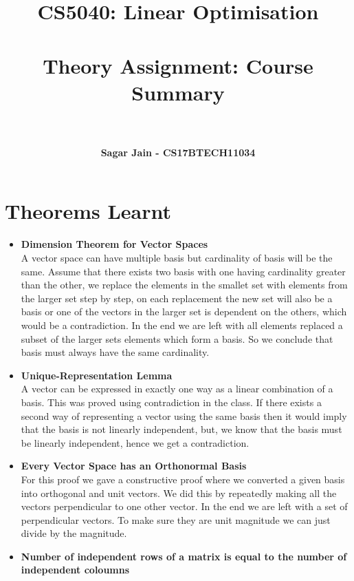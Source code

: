 \documentclass[a4paper,12pt]{report}
\begin{document}
\title{
\textbf{CS5040: Linear Optimisation\\~\\Theory Assignment: Course Summary}\\~\\
}
\author{\textbf{Sagar Jain - CS17BTECH11034}\\}
\maketitle
\begin{large}
\tableofcontents
\end{large}
\newpage
\section{Theorems Learnt}
\begin{itemize}
\item \textbf{Dimension Theorem for Vector Spaces}\\
A vector space can have multiple basis but cardinality of basis will be the same. Assume that there exists two basis with one having cardinality greater than the other, we replace the elements in the smallet set with elements from the larger set step by step, on each replacement the new set will also be a basis or one of the vectors in the larger set is dependent on the others, which would be a contradiction. In the end we are left with all elements replaced a subset of the larger sets elements which form a basis. So we conclude that basis must always have the same cardinality.
\item \textbf{Unique-Representation Lemma}\\
A vector can be expressed in exactly one way as a linear combination of a basis. This was proved using contradiction in the class. If there exists a second way of representing a vector using the same basis then it would imply that the basis is not linearly independent, but, we know that the basis must be linearly independent, hence we get a contradiction. 
\item \textbf{Every Vector Space has an Orthonormal Basis}\\
For this proof we gave a constructive proof where we converted a given basis into orthogonal and unit vectors. We did this by repeatedly making all the vectors perpendicular to one other vector. In the end we are left with a set of perpendicular vectors. To make sure they are unit magnitude we can just divide by the magnitude.
\item \textbf{Number of independent rows of a matrix is equal to the number of independent coloumns}

\end{itemize}
\end{document}
